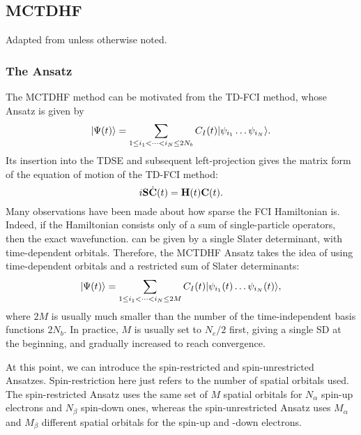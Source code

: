 \documentclass{article}
\begin{document}
\subsection{MCTDHF}
Adapted from \cite{hochstuhlTimedependentMulticonfigurationMethods2014} unless otherwise noted.
\subsubsection{The Ansatz}
The MCTDHF method can be motivated from the TD-FCI method, whose Ansatz is given by
\begin{equation}
    |\Psi(t)\rangle=\sum_{1\leq i_1<\dots<i_N\leq 2N_b} C_I(t)|\psi_{i_1}\dots\psi_{i_N}\rangle.
\end{equation}
Its insertion into the TDSE and subsequent left-projection gives the matrix form of the equation of motion of the TD-FCI method:
\begin{equation}
    i\bm{\mathrm{S}}\dot{\bm{\mathrm{C}}}(t)=\bm{\mathrm{H}}(t)\bm{\mathrm{C}}(t).
\end{equation}
Many observations have been made about how sparse the FCI Hamiltonian is. Indeed, if the Hamiltonian consists only of a sum of single-particle operators, then the exact wavefunction.
can be given by a single Slater determinant, with time-dependent orbitals. Therefore, the MCTDHF Ansatz takes the idea of using time-dependent orbitals and a restricted sum of Slater determinants:
\begin{equation}
    |\Psi(t)\rangle=\sum_{1\leq i_1<\dots<i_N\leq 2M} C_I(t)|\psi_{i_1}(t)\dots\psi_{i_N}(t)\rangle,
\end{equation}
where $2M$ is usually much smaller than the number of the time-independent basis functions $2N_b$. In practice, $M$ is usually set to $N_e/2$ first, giving a single SD at the beginning, and gradually increased to reach convergence.

At this point, we can introduce the spin-restricted and spin-unrestricted Ansatzes. Spin-restriction here just refers to the number of spatial orbitals used. The spin-restricted Ansatz uses the same set of $M$ spatial orbitals for $N_{\alpha}$ spin-up electrons and $N_{\beta}$ spin-down ones, whereas the spin-unrestricted Ansatz uses $M_{\alpha}$ and $M_{\beta}$ different spatial orbitals for the spin-up and -down electrons.
\end{document}
